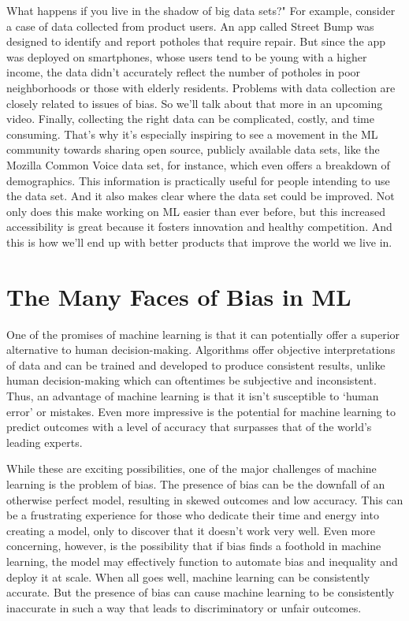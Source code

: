 What happens if you live in the shadow of big data sets?"
For example, consider a case of data collected from product users.
An app called Street Bump was designed to identify and report
potholes that require repair.
But since the app was deployed on smartphones,
whose users tend to be young with a higher income,
the data didn't accurately reflect the number
of potholes in poor neighborhoods or those with elderly residents.
Problems with data collection are closely related to issues of bias.
So we'll talk about that more in an upcoming video.
Finally, collecting the right data can be complicated, costly,
and time consuming.
That's why it's especially inspiring to see a movement in the ML community
towards sharing open source, publicly available data
sets, like the Mozilla Common Voice data set,
for instance, which even offers a breakdown of demographics.
This information is practically useful for people
intending to use the data set.
And it also makes clear where the data set could be improved.
Not only does this make working on ML easier than ever before,
but this increased accessibility is great
because it fosters innovation and healthy competition.
And this is how we'll end up with better products that
improve the world we live in.
  
\section{The Many Faces of Bias in ML}

One of the promises of machine learning is that it can potentially offer a superior alternative to human decision-making. Algorithms offer objective interpretations of data and can be trained and developed to produce consistent results, unlike human decision-making which can oftentimes be subjective and inconsistent. Thus, an advantage of machine learning is that it isn’t susceptible to ‘human error’ or mistakes. Even more impressive is the potential for machine learning to predict outcomes with a level of accuracy that surpasses that of the world’s leading experts.

While these are exciting possibilities, one of the major challenges of machine learning is the problem of bias. The presence of bias can be the downfall of an otherwise perfect model, resulting in skewed outcomes and low accuracy. This can be a frustrating experience for those who dedicate their time and energy into creating a model, only to discover that it doesn’t work very well. Even more concerning, however, is the possibility that if bias finds a foothold in machine learning, the model may effectively function to automate bias and inequality and deploy it at scale. When all goes well, machine learning can be consistently accurate. But the presence of bias can cause machine learning to be consistently inaccurate in such a way that leads to discriminatory or unfair outcomes.

